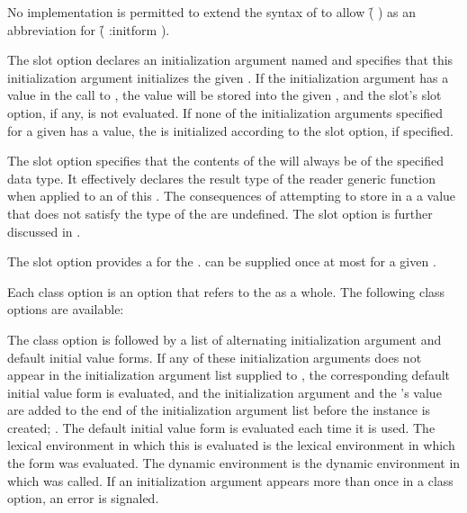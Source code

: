 No implementation is permitted to extend the syntax of 
to allow \f{( )} as an abbreviation for 
\f{( :initform )}.
 
\itemitem{\bull}
The  slot option declares an initialization
argument named  and specifies that this
initialization argument initializes the given .  If the
initialization argument has a value in the call to
, the value will be stored into the given ,
and the slot's  slot option, if any, is not
evaluated.  If none of the initialization arguments specified for a
given  has a value, the  is initialized according to the
 slot option, if specified.  
 
\itemitem{\bull}
The  slot option specifies that the contents of the
 will always be of the specified data type.  It effectively
declares the result type of the reader generic function when applied
to an  of this .  The consequences of attempting to store in a
 a value that does not satisfy the type of the  are undefined.
The  slot option is further discussed in 
\secref\SlotInheritance.
 
\itemitem{\bull}
The  slot option provides a 
for the .   can be supplied once at most 
for a given . 
\endlist
 
Each class option is an option that refers to the  as a whole.
The following class options are available:
 
\beginlist
\itemitem{\bull}
The  class option is followed by a list of
alternating initialization argument  and default initial value
forms.  If any of these initialization arguments does not appear in
the initialization argument list supplied to , the
corresponding default initial value form is evaluated, and the
initialization argument  and the 's value are added to the end
of the initialization argument list before the instance is created;
\seesection\ObjectCreationAndInit.
The default initial value form is evaluated each time it is used.  The lexical
environment in which this  is evaluated is the lexical environment
in which the  form was evaluated.  The dynamic
environment is the dynamic environment in which 
was called.  If an initialization argument  appears more than once
in a  class option, an error is signaled.
 
